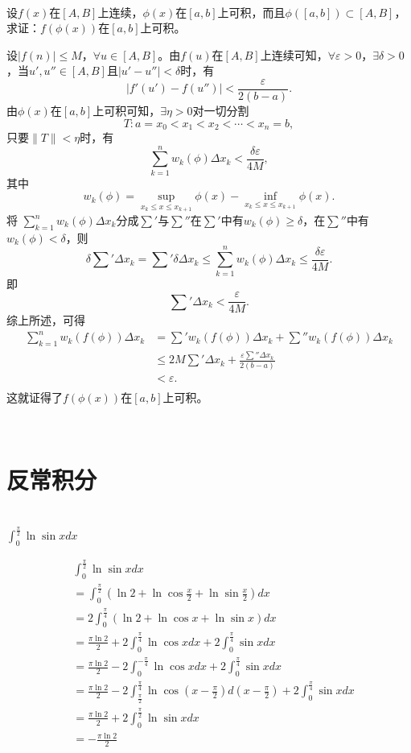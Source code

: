 \begin{example}
\hfill\\
 设$f(x)$在$[A,B]$上连续，$\phi(x)$在$[a,b]$上可积，而且$\phi([a,b])\subset[A,B]$，求证：$f(\phi(x))$在$[a,b]$上可积。
 
   设$|f(n)|\leq M$，$\forall u\in[A,B]$。由$f(u)$在$[A,B]$上连续可知，$\forall\varepsilon>0$，$\exists\delta>0$，当$u',u''\in[A,B]$且$|u'-u''|<\delta$时，有
  $$|f'(u')-f(u'')|<\frac{\varepsilon}{2(b-a)}.$$
  由$\phi(x)$在$[a,b]$上可积可知，$\exists\eta>0$对一切分割
  $$T:a=x_0<x_1<x_2<\cdots<x_n=b,$$
  只要$\|T\|<\eta$时，有
  $$\sum_{k=1}^nw_k(\phi)\Delta x_k<\frac{\delta\varepsilon}{4M},$$
  其中$$w_k(\phi)=\sup_{x_k\leq x\leq x_{k+1}}\phi(x)-\inf_{x_k\leq x\leq x_{k+1}}\phi(x).$$
  将 $\sum\limits_{k=1}^nw_k(\phi)\Delta x_k$分成$\sum\limits'$与$\sum\limits''$在$\sum\limits'$中有$w_k(\phi)\geq\delta$，在$\sum\limits''$中有$w_k(\phi)<\delta$，则
  $$\delta\sum'\Delta x_k=\sum'\delta\Delta x_k\leq\sum_{k=1}^nw_k(\phi)\Delta x_k\leq\frac{\delta\varepsilon}{4M}.$$
  即$$\sum'\Delta x_k<\frac{\varepsilon}{4M}.$$
  综上所述，可得
  \begin{align*}
  \sum_{k=1}^nw_k(f(\phi))\Delta x_k&=\sum'w_k(f(\phi))\Delta x_k+\sum''w_k(f(\phi))\Delta x_k\\
  &\leq2M\sum'\Delta x_k+\frac{\varepsilon\sum''\Delta x_k}{2(b-a)}\\
  &<\varepsilon.\\
  \end{align*}
  这就证得了$f(\phi(x))$在$[a,b]$上可积。
\end{example}  
 \hfill\\
 
    \section{反常积分}
    \begin{example}
    \hfill\\
    $\int_0^{\frac {\pi}2}\ln\sin xdx$
    
    
    \begin{equation}
  \begin{aligned}
  &\int_0^{\frac{\pi}{2}}\ln\sin xdx\\
  &=\int_0^{\frac{\pi}{2}}(\ln2+\ln\cos\frac{x}{2}+\ln\sin\frac{x}{2})dx\\
  &=2\int_0^{\frac{\pi}{4}}(\ln2+\ln\cos x+\ln\sin x)dx\\
  &=\frac{\pi\ln2}{2}+2\int_0^{\frac{\pi}{4}}\ln\cos xdx+2\int_0^{\frac{\pi}{4}}\sin xdx\\
  &=\frac{\pi\ln2}{2}-2\int_0^{-\frac{\pi}{4}}\ln\cos xdx+2\int_0^{\frac{\pi}{4}}\sin xdx\\
  &=\frac{\pi\ln2}{2}-2\int_{\frac{\pi}{2}}^{\frac{\pi}{4}}\ln\cos(x-\frac{\pi}{2})d(x-\frac{\pi}{2})+2\int_0^{\frac{\pi}{4}}\sin xdx\\
  &=\frac{\pi\ln2}{2}+2\int_0^{\frac{\pi}{2}}\ln\sin xdx\\
  &=-\frac{\pi\ln2}{2}\\
  \end{aligned}
  \end{equation}
    
    \end{example}
  
